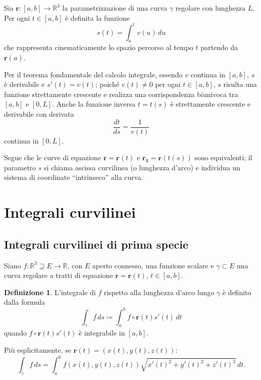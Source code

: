 \documentclass[a4paper]{book}
\numberwithin{equation}{section}
\theoremstyle{plain}
\theoremstyle{definition}
\newtheorem{defn}{Definizione}[section]
\theoremstyle{remark}
\renewcommand{\vec}{\boldsymbol}
\theoremstyle{example}
\begin{document}
Sia $\vec{r} \colon \! [a, b] \to \mathbb{R}^3$ la parametrizzazione di una curva $\gamma$ regolare con lunghezza $L$. Per ogni $t \in [a, b]$ è definita la funzione
\begin{equation*}
	s(t) = \int_a^t v(u)\, du
\end{equation*}
che rappresenta cinematicamente lo spazio percorso al tempo $t$ partendo da $\vec{r}(a)$.

Per il teorema fondamentale del calcolo integrale, essendo $v$ continua in $[a, b]$, $s$ è derivabile e $s'(t) = v(t)$; poiché $v(t) \ne 0$ per ogni $t \in [a, b]$, $s$ risulta una funzione strettamente crescente e realizza una corrispondenza biunivoca tra $[a, b]$ e $[0, L]$. Anche la funzione inversa $t = t(s)$ è strettamente crescente e derivabile con derivata
\begin{equation*}
	\frac{dt}{ds} = \frac{1}{v(t)}
\end{equation*}
continua in $[0, L]$.

Segue che le curve di equazione $\vec{r} = \vec{r}(t)$ e $\vec{r_1} = \vec{r}(t(s))$ sono equivalenti; il parametro $s$ si chiama ascissa curvilinea (o lunghezza d'arco) e individua un sistema di coordinate ``intrinseco'' alla curva.

\section{Integrali curvilinei}
\subsection{Integrali curvilinei di prima specie}

Siano $f \colon \mathbb{R}^3 \supseteq E \to \mathbb{R}$, con $E$ aperto connesso, una funzione scalare e $\gamma \subset E$ una curva regolare a tratti di equazione $\vec{r} = \vec{r}(t)$, $t \in [a, b]$.

\begin{defn}
	L'integrale di $f$ rispetto alla lunghezza d'arco lungo $\gamma$ è definito dalla formula
	\begin{equation}
		\label{eqn:intcurv1}
		\int_{\gamma}f\, ds \coloneqq \int_a^b f \circ \vec{r}(t)s'(t)\, dt
	\end{equation}
	quando $f \circ \vec{r}(t)s'(t)$ è integrabile in $[a, b]$.
\end{defn}

Più esplicitamente, se $\vec{r}(t) = (x(t), y(t), z(t))$:
\begin{equation*}
	\int_{\gamma} f \, ds = \int_a^b f(x(t), y(t), z(t)) \sqrt{x'(t)^2 + y'(t)^2 + z'(t)^2} \, dt.
\end{equation*}
\end{document}
